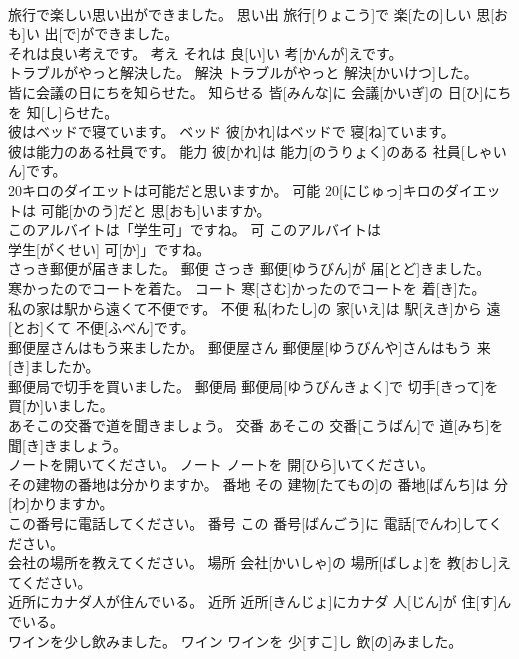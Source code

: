 \documentclass[8pt]{extreport}
\begin{document}
\begin{CJK}{UTF8}{min}
\\	旅行で楽しい思い出ができました。	思い出	旅行[りょこう]で 楽[たの]しい 思[おも]い 出[で]ができました。	
\\	それは良い考えです。	考え	それは 良[い]い 考[かんが]えです。	
\\	トラブルがやっと解決した。	解決	トラブルがやっと 解決[かいけつ]した。	
\\	皆に会議の日にちを知らせた。	知らせる	皆[みんな]に 会議[かいぎ]の 日[ひ]にちを 知[し]らせた。	
\\	彼はベッドで寝ています。	ベッド	彼[かれ]はベッドで 寝[ね]ています。	
\\	彼は能力のある社員です。	能力	彼[かれ]は 能力[のうりょく]のある 社員[しゃいん]です。	
\\	20キロのダイエットは可能だと思いますか。	可能	20[にじゅっ]キロのダイエットは 可能[かのう]だと 思[おも]いますか。	
\\	このアルバイトは「学生可」ですね。	可	このアルバイトは
\\	学生[がくせい] 可[か]」ですね。	
\\	さっき郵便が届きました。	郵便	さっき 郵便[ゆうびん]が 届[とど]きました。	
\\	寒かったのでコートを着た。	コート	寒[さむ]かったのでコートを 着[き]た。	
\\	私の家は駅から遠くて不便です。	不便	私[わたし]の 家[いえ]は 駅[えき]から 遠[とお]くて 不便[ふべん]です。	
\\	郵便屋さんはもう来ましたか。	郵便屋さん	郵便屋[ゆうびんや]さんはもう 来[き]ましたか。	
\\	郵便局で切手を買いました。	郵便局	郵便局[ゆうびんきょく]で 切手[きって]を 買[か]いました。	
\\	あそこの交番で道を聞きましょう。	交番	あそこの 交番[こうばん]で 道[みち]を 聞[き]きましょう。	
\\	ノートを開いてください。	ノート	ノートを 開[ひら]いてください。	
\\	その建物の番地は分かりますか。	番地	その 建物[たてもの]の 番地[ばんち]は 分[わ]かりますか。	
\\	この番号に電話してください。	番号	この 番号[ばんごう]に 電話[でんわ]してください。	
\\	会社の場所を教えてください。	場所	会社[かいしゃ]の 場所[ばしょ]を 教[おし]えてください。	
\\	近所にカナダ人が住んでいる。	近所	近所[きんじょ]にカナダ 人[じん]が 住[す]んでいる。	
\\	ワインを少し飲みました。	ワイン	ワインを 少[すこ]し 飲[の]みました。	

\end{CJK}
\end{document}
